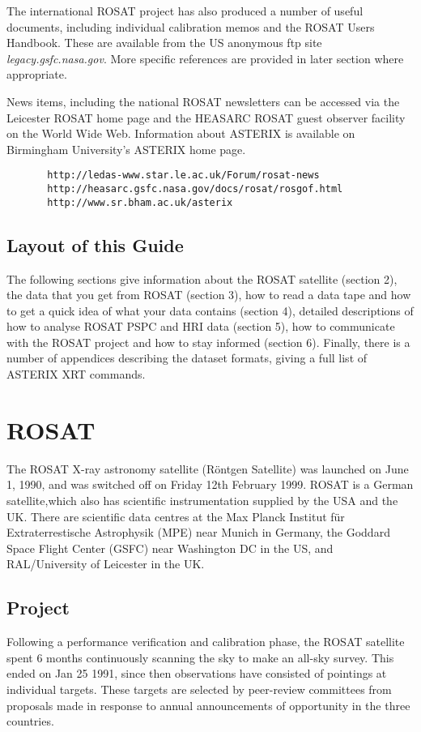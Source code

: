 \documentclass[11pt,fleqn]{article}    %
\begin{document}
The international ROSAT project has also produced a number of useful
documents, including individual calibration memos and the ROSAT Users
Handbook. These are available from the US anonymous ftp site {\it
legacy.gsfc.nasa.gov}.  More specific references are provided in later
section where appropriate.

News items, including the national ROSAT newsletters can be accessed
via the Leicester ROSAT home page and the HEASARC ROSAT guest observer
facility on the World Wide Web.  Information about ASTERIX is
available on Birmingham University's ASTERIX home page.

\begin{verbatim}
       http://ledas-www.star.le.ac.uk/Forum/rosat-news  
       http://heasarc.gsfc.nasa.gov/docs/rosat/rosgof.html
       http://www.sr.bham.ac.uk/asterix
\end{verbatim}

\subsection{Layout of this Guide}
The following sections give information about the ROSAT satellite (section 2),
the data that you get from ROSAT (section 3), how to read a data tape and
how to get a quick idea of what your data contains (section 4), detailed
descriptions of how to analyse ROSAT PSPC and HRI data (section 5), how to
communicate with the ROSAT project and how to stay informed (section 6).
Finally, there is a number of appendices describing the dataset formats,
giving a full list of ASTERIX XRT commands.

\newpage
\section{ROSAT}
The ROSAT X-ray astronomy satellite (R\"ontgen Satellite) was launched on
June 1, 1990, and was switched off on Friday 12th February 1999. ROSAT 
is a German satellite,which also has scientific instrumentation supplied by the 
USA and the UK. There are scientific data centres at the Max Planck Institut 
f\"ur Extraterrestische Astrophysik (MPE) near Munich in Germany, the 
Goddard Space Flight Center (GSFC) near Washington DC in the US, and 
RAL/University of Leicester in the UK. 

\subsection{Project}
Following a performance verification and calibration phase, the ROSAT
satellite spent 6 months continuously scanning the sky to make an all-sky
survey. This ended on Jan 25 1991, since then observations have consisted
of pointings at individual targets. These targets are selected by
peer-review committees from proposals made in response to annual announcements
of opportunity in the three countries.
\end{document}
